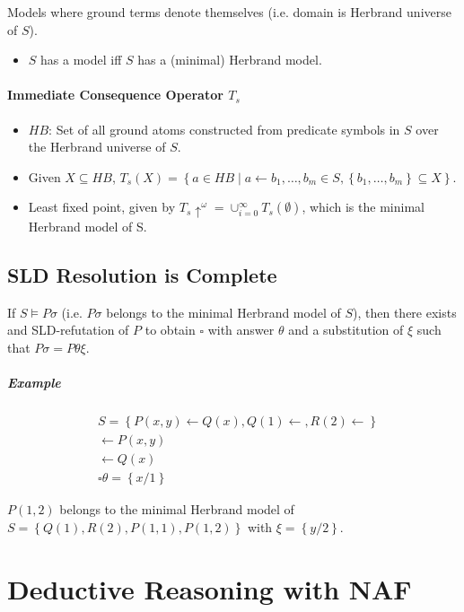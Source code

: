 \documentclass[twocolumn,english]{article}
\let\emph\relax
\begin{document}
Models where ground terms denote themselves (i.e. domain is Herbrand
universe of $S$). 
\begin{itemize}
\item $S$ has a model iff $S$ has a (minimal) Herbrand model. 
\end{itemize}

\paragraph{Immediate Consequence Operator $T_{s}$}
\begin{itemize}
\item \emph{Herbrand Base} $HB$: Set of all ground atoms constructed from
predicate symbols in $S$ over the Herbrand universe of $S$. 
\item Given $X\subseteq HB$, $T_{s}\left(X\right)=\left\{ a\in HB\mid a\leftarrow b_{1},\dots,b_{m}\in S,\left\{ b_{1},\dots,b_{m}\right\} \subseteq X\right\} $. 
\item Least fixed point, given by $T_{s}\uparrow^{\omega}=\cup_{i=0}^{\infty}T_{s}\left(\emptyset\right)$,
which is the minimal Herbrand model of S. 
\end{itemize}

\subsection{SLD Resolution is Complete}

If $S\vDash P\sigma$ (i.e. $P\sigma$ belongs to the minimal Herbrand
model of $S$), then there exists and SLD-refutation of $P$ to obtain
$\square$ with answer $\theta$ and a substitution of $\xi$ such
that $P\sigma=P\theta\xi$.

\subparagraph{Example}

\begin{align*}
 & S=\left\{ P\left(x,y\right)\leftarrow Q\left(x\right),Q\left(1\right)\leftarrow,R\left(2\right)\leftarrow\right\} \\
 & \leftarrow P\left(x,y\right)\\
 & \leftarrow Q\left(x\right)\\
 & \square\theta=\left\{ x/1\right\} 
\end{align*}

$P\left(1,2\right)$ belongs to the minimal Herbrand model of $S=\left\{ Q\left(1\right),R\left(2\right),P\left(1,1\right),P\left(1,2\right)\right\} $
with $\xi=\left\{ y/2\right\} $.

\section{Deductive Reasoning with NAF}
\end{document}
